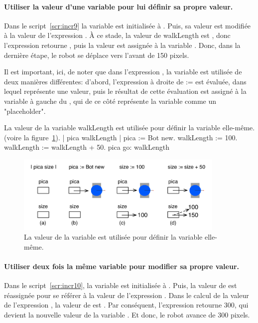 \documentclass[a4paper,10pt,twoside]{book}
\begin{document}
\paragraph{Utiliser la valeur d'une variable pour lui d\'efinir sa propre valeur.}
Dans le script~\ref{scr:incr9} la variable  est initialis\'ee \`a . Puis, sa valeur est modifi\'ee \`a la valeur de l'expression . \`A ce stade, la valeur de walkLength est , donc l'expression  retourne , puis la valeur  est assign\'ee \`a la variable  . Donc, dans la derni\`ere \'etape, le robot se d\'eplace vers l'avant de 150 pixels. 

Il est important, ici, de noter que dans l'expression , la variable  est utilis\'ee de deux mani\`eres diff\'erentes: d'abord, l'expression \`a droite de := est \'evalu\'ee, dans lequel  repr\'esente une valeur, puis le r\'esultat de cette \'evaluation est assign\'e \`a la variable  \`a gauche du \ct{:=}, qui de ce c\^ot\'e repr\'esente la variable comme un "placeholder".


\begin{script}[incr9]{La valeur de la variable walkLength est utilis\'ee pour d\'efinir la variable elle-m\^eme.  (voire la figure~\ref{fig:boxOne4}).}
	| pica walkLength | 
	pica := Bot new. 
	walkLength := 100. 
	walkLength := walkLength + 50. 
	pica go: walkLength
\end{script}

\begin{figure}[h]
	\centerline{\includegraphics[width=10cm]{boxFour}}
	\caption{La valeur de la variable  est utilis\'ee pour d\'efinir la variable elle-m\^eme. 
	\label{fig:boxOne4}}
\end{figure}



\paragraph{Utiliser deux fois la m\^eme variable pour modifier sa propre valeur.}
Dans le script~\ref{scr:incr10}, la variable  est initialis\'ee \`a . Puis, la valeur de  est r\'eassign\'ee pour se r\'ef\'erer \`a la valeur de l'expression . Dans le calcul de la valeur de l'expression , la valeur de  est . Par cons\'equent, l'expression retourne 300, qui devient la nouvelle valeur de la variable . Et donc, le robot avance de 300 pixels. 
\end{document}
